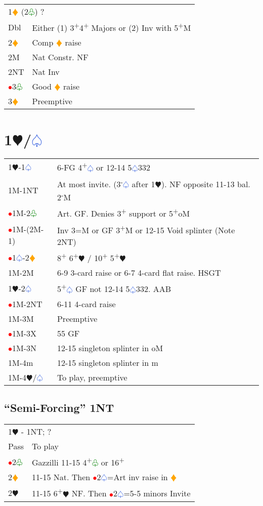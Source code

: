 \documentclass{article}
\renewcommand{\sp}{\textcolor{RoyalBlue}{$\varspade$}}
\newcommand{\he}{\textcolor{RubineRed}{$\varheart$}}
\newcommand{\di}{\textcolor{Orange}{$\vardiamond$}}
\newcommand{\cl}{\textcolor{Green}{$\varclub$}}
\newcommand{\nt}{\relsize{-1}NT\relsize{1}}
\newcommand{\up}{\textsuperscript{+}}
\newcommand{\down}{\textsuperscript{-}}
\newcommand{\al}{\textcolor{red}{$\bullet$}}
\begin{document}
\begin{tabular}{|l|p{6.5cm}}
	\multicolumn{2}{l}{1\di{} (2\cl{}) ?}\\
	Dbl & Either (1) 3\up{}4\up{} Majors or (2) Inv with 5\up{}M \\
	2\di{} & Comp \di{} raise \\
	2M & Nat Constr. NF \\
	2\nt{} & Nat Inv \\
	\al{}3\cl{} & Good \di{} raise \\
	3\di{} & Preemptive \\
\end{tabular}

\section{1\he/\sp{}}

\begin{tabular}{|l|p{6.5cm}}
	1\he{}-1\sp{} & 6-FG 4\up\sp{} or 12-14 5\sp{}332 \\
	1M-1\nt{}& At most invite. (3\down\sp{} after 1\he{}). NF opposite 11-13 bal. 2\down{}M \\
	\al{}1M-2\cl{} & Art. GF. Denies 3\up{} support or 5\up{}oM \\
	\al{}1M-(2M-1) & Inv 3=M or GF 3\up{}M or 12-15 Void splinter (Note 2\nt{}) \\
	\al{}1\sp{}-2\di{} & 8\up{} 6\up{}\he{} / 10\up{} 5\up{}\he{} \\ 
	1M-2M & 6-9 3-card raise or 6-7 4-card flat raise. HSGT \\
	1\he{}-2\sp{} & 5\up{}\sp{} GF not 12-14 5\sp{}332. AAB \\ 
	\al{}1M-2\nt & 6-11 4-card raise \\
	1M-3M & Preemptive \\
	\al{}1M-3X & 55 GF \\
	\al{}1M-3N & 12-15 singleton splinter in oM \\
	1M-4m & 12-15 singleton splinter in m \\
	1M-4\he{}/\sp{} & To play, preemptive \\ 

\end{tabular}

\subsection{``Semi-Forcing'' 1\nt{}}

\begin{tabular}{|l|p{6.5cm}}
	\multicolumn{2}{l}{1\he{} - 1\nt{}; ?}\\
	Pass & To play \\
	\al{}2\cl{} & Gazzilli 11-15 4\up\cl{} or 16\up \\
	2\di{} & 11-15 Nat. Then \al{}2\sp{}=Art inv raise in \di{} \\
	2\he{}& 11-15 6\up\he{} NF. Then \al{}2\sp{}=5-5 minors Invite \\
\end{tabular}
\end{document}
